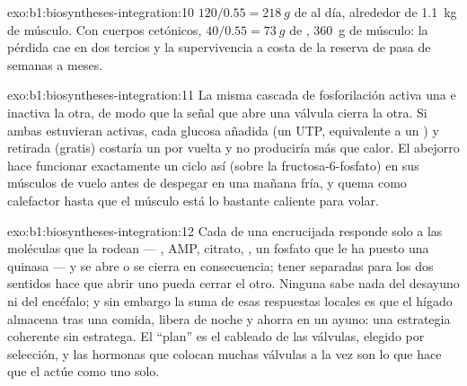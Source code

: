 \begin{solution}{exo:b1:biosyntheses-integration:10}
$120/0.55 = \qty{218}{g}$ de  al día, alrededor de \qty{1.1}{kg} de
músculo. Con cuerpos cetónicos, $40/0.55 = \qty{73}{g}$ de ,
\qty{360}{g} de músculo: la pérdida cae en dos tercios y la supervivencia a
costa de la reserva de  pasa de semanas a meses.
\end{solution}

\begin{solution}{exo:b1:biosyntheses-integration:11}
La misma cascada de fosforilación activa una e inactiva la otra, de modo que
la señal que abre una válvula cierra la otra. Si ambas estuvieran activas,
cada glucosa añadida (un UTP, equivalente a un ) y retirada (gratis)
costaría un  por vuelta y no produciría más que calor. El abejorro hace
funcionar exactamente un ciclo así (sobre la fructosa-6-fosfato) en sus
músculos de vuelo antes de despegar en una mañana fría, y quema  como
calefactor hasta que el músculo está lo bastante caliente para volar.
\end{solution}

\begin{solution}{exo:b1:biosyntheses-integration:12}
Cada  de una encrucijada responde solo a las moléculas que la rodean
--- , AMP, citrato, , un fosfato que le ha puesto una quinasa
--- y se abre o se cierra en consecuencia; tener  separadas para los
dos sentidos hace que abrir uno pueda cerrar el otro. Ninguna  sabe
nada del desayuno ni del encéfalo; y sin embargo la suma de esas respuestas
locales es que el hígado almacena tras una comida, libera de noche y ahorra
 en un ayuno: una estrategia coherente sin estratega. El ``plan'' es
el cableado de las válvulas, elegido por selección, y las hormonas que
colocan muchas válvulas a la vez son lo que hace que el  actúe como
uno solo.
\end{solution}

